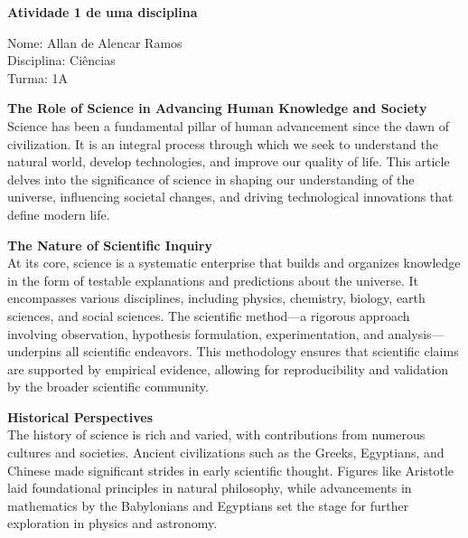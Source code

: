 \documentclass[12pt, a4paper, twocolumn]{article}
\begin{document}
\begin{center}
\large\textbf{Atividade 1 de uma disciplina}
\end{center}
\vspace{0.5cm}

\begin{flushleft}
Nome: Allan de Alencar Ramos\\
Disciplina: Ciências\\
Turma: 1A
\end{flushleft}

\textbf{The Role of Science in Advancing Human Knowledge and Society}\\

Science has been a fundamental pillar of human advancement since the dawn of civilization. It is an integral process through which we seek to understand the natural world, develop technologies, and improve our quality of life. This article delves into the significance of science in shaping our understanding of the universe, influencing societal changes, and driving technological innovations that define modern life.

\textbf{The Nature of Scientific Inquiry}\\

At its core, science is a systematic enterprise that builds and organizes knowledge in the form of testable explanations and predictions about the universe. It encompasses various disciplines, including physics, chemistry, biology, earth sciences, and social sciences. The scientific method—a rigorous approach involving observation, hypothesis formulation, experimentation, and analysis—underpins all scientific endeavors. This methodology ensures that scientific claims are supported by empirical evidence, allowing for reproducibility and validation by the broader scientific community.

\textbf{Historical Perspectives}\\

The history of science is rich and varied, with contributions from numerous cultures and societies. Ancient civilizations such as the Greeks, Egyptians, and Chinese made significant strides in early scientific thought. Figures like Aristotle laid foundational principles in natural philosophy, while advancements in mathematics by the Babylonians and Egyptians set the stage for further exploration in physics and astronomy.
\end{document}
